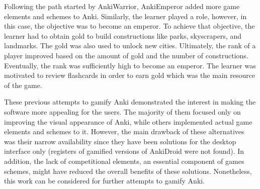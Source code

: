 Following the path started by AnkiWarrior, AnkiEmperor \citep{proxx2012emperor} added more game elements and schemes to Anki. Similarly, the learner played a role, however, in this case, the objective was to become an emperor. To achieve that objective, the learner had to obtain gold to build constructions like parks, skyscrapers, and landmarks. The gold was also used to unlock new cities. Ultimately, the rank of a player improved based on the amount of gold and the number of constructions. Eventually, the rank was sufficiently high to become an emperor. The learner was motivated to review flashcards in order to earn gold which was the main resource of the game.

These previous attempts to gamify Anki demonstrated the interest in making the software more appealing for the users. The majority of them focused only on improving the visual appearance of Anki, while others implemented actual game elements and schemes to it. However, the main drawback of these alternatives was their narrow availability since they have been solutions for the desktop interface only (registers of gamified versions of AnkiDroid were not found). In addition, the lack of competitional elements, an essential component of games schemes, might have reduced the overall benefits of these solutions. Nonetheless, this work can be considered for further attempts to gamify Anki.
